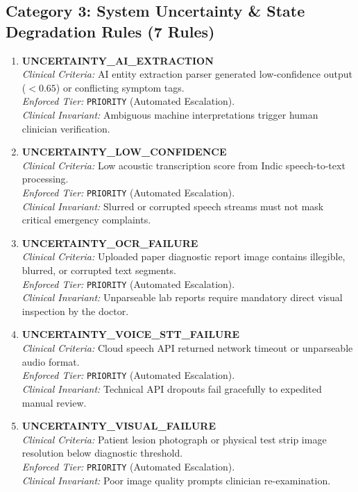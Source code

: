 \documentclass[11pt,a4paper,oneside]{report}
\begin{document}
\subsection{Category 3: System Uncertainty \& State Degradation Rules (7 Rules)}

\begin{enumerate}[leftmargin=20pt, resume]
  \item \textbf{UNCERTAINTY\_AI\_EXTRACTION}\\
  \textit{Clinical Criteria:} AI entity extraction parser generated low-confidence output ($< 0.65$) or conflicting symptom tags.\\
  \textit{Enforced Tier:} \texttt{PRIORITY} (Automated Escalation).\\
  \textit{Clinical Invariant:} Ambiguous machine interpretations trigger human clinician verification.

  \item \textbf{UNCERTAINTY\_LOW\_CONFIDENCE}\\
  \textit{Clinical Criteria:} Low acoustic transcription score from Indic speech-to-text processing.\\
  \textit{Enforced Tier:} \texttt{PRIORITY} (Automated Escalation).\\
  \textit{Clinical Invariant:} Slurred or corrupted speech streams must not mask critical emergency complaints.

  \item \textbf{UNCERTAINTY\_OCR\_FAILURE}\\
  \textit{Clinical Criteria:} Uploaded paper diagnostic report image contains illegible, blurred, or corrupted text segments.\\
  \textit{Enforced Tier:} \texttt{PRIORITY} (Automated Escalation).\\
  \textit{Clinical Invariant:} Unparseable lab reports require mandatory direct visual inspection by the doctor.

  \item \textbf{UNCERTAINTY\_VOICE\_STT\_FAILURE}\\
  \textit{Clinical Criteria:} Cloud speech API returned network timeout or unparseable audio format.\\
  \textit{Enforced Tier:} \texttt{PRIORITY} (Automated Escalation).\\
  \textit{Clinical Invariant:} Technical API dropouts fail gracefully to expedited manual review.

  \item \textbf{UNCERTAINTY\_VISUAL\_FAILURE}\\
  \textit{Clinical Criteria:} Patient lesion photograph or physical test strip image resolution below diagnostic threshold.\\
  \textit{Enforced Tier:} \texttt{PRIORITY} (Automated Escalation).\\
  \textit{Clinical Invariant:} Poor image quality prompts clinician re-examination.


\end{enumerate}
\end{document}
